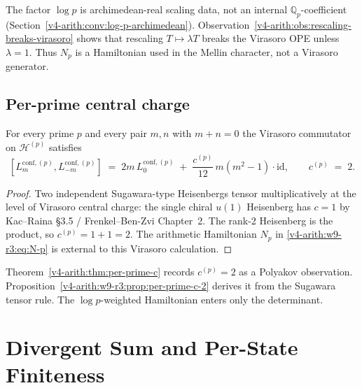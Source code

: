 \begin{remark}
\label{v4-arith:w9-r3:rem:log-p-archimedean}
The factor \(\log p\) is archimedean-real scaling data, not an
internal \(\mathbb{Q}_{p}\)-coefficient
(Section~\ref{v4-arith:conv:log-p-archimedean}). Observation~\ref{v4-arith:obs:rescaling-breaks-virasoro} shows that rescaling
\(T\mapsto\lambda T\) breaks the Virasoro OPE unless \(\lambda=1\).
Thus \(N_{p}\) is a Hamiltonian used in the Mellin character, not a
Virasoro generator.
\end{remark}

\subsection{Per-prime central charge}
\label{v4-arith:w9-r3:per-prime-central}

\begin{proposition}
\label{v4-arith:w9-r3:prop:per-prime-c-2}
For every prime \(p\) and every pair \(m,n\)
with \(m+n=0\) the Virasoro commutator on \(\mathcal{H}^{(p)}\) satisfies
\begin{equation}
\label{v4-arith:w9-r3:eq:per-prime-bracket}
[L_{m}^{\mathrm{conf},(p)},L_{-m}^{\mathrm{conf},(p)}]\;=\;2m\,L_{0}^{\mathrm{conf},(p)}\;+\;\frac{c^{(p)}}{12}\,m(m^{2}-1)\cdot\mathrm{id},\qquad c^{(p)}\;=\;2.
\end{equation}
\end{proposition}

\begin{proof}
Two independent Sugawara-type Heisenbergs tensor multiplicatively at
the level of Virasoro central charge: the single chiral \(u(1)\)
Heisenberg has \(c=1\) by Kac--Raina \S 3.5 / Frenkel--Ben-Zvi
Chapter~2. The rank-2 Heisenberg is the product, so
\(c^{(p)}=1+1=2\). The arithmetic Hamiltonian \(N_{p}\) in
\eqref{v4-arith:w9-r3:eq:N-p} is external to this Virasoro
calculation.
\end{proof}

\begin{remark}[independence of \(p\)]
\label{v4-arith:w9-r3:rem:p-independence}
Theorem~\ref{v4-arith:thm:per-prime-c} records \(c^{(p)}=2\) as a Polyakov
observation. Proposition~\ref{v4-arith:w9-r3:prop:per-prime-c-2}
derives it from the Sugawara tensor rule. The \(\log p\)-weighted
Hamiltonian enters only the determinant.
\end{remark}

\section{Divergent Sum and Per-State Finiteness}
\label{v4-arith:w9-r3:per-state}

